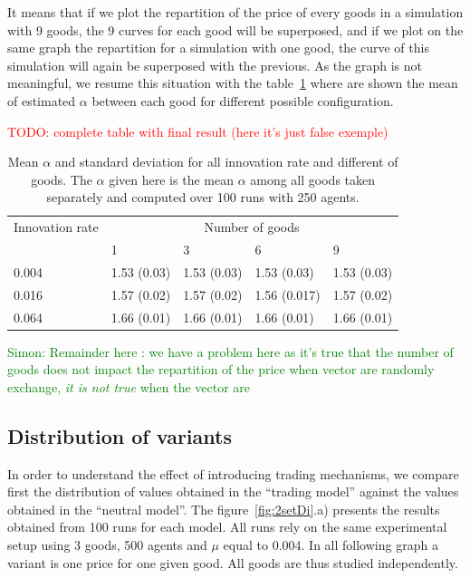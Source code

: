 \documentclass{wscpaperproc}
\newcommand{\memo}[2]{\textcolor{#1}{#2}}
\newcommand{\todo}[1]{\memo{red}{TODO: #1\\}}
\newcommand{\simon}[1]{\memo{green}{Simon: #1\\}}
\begin{document}
It means that if we plot the repartition of the price of every goods in a simulation with 9 goods, the 9 curves for each good will be superposed, and if we plot on the same graph the repartition for a simulation with one good, the curve of this simulation will again be superposed with the previous. As the graph is not meaningful, we resume this situation with the table~\ref{tab:multiGoods} where are shown the mean of estimated $\alpha$ between each good for different possible configuration.


\todo{complete table with final result (here it's just false exemple)}
\begin{table}[h]
	\centering
	\begin{tabular}{l|llll}
		Innovation rate &\multicolumn{4}{c}{Number of goods}\\
		      & 1   & 3   &  6 & 9  \\\hline
		0.004 &1.53 (0.03)  &1.53 (0.03)&1.53 (0.03)&1.53 (0.03) \\
		0.016 &1.57 (0.02)  &1.57 (0.02)&1.56 (0.017)&1.57 (0.02) \\
		0.064 &1.66 (0.01)  &1.66 (0.01)&1.66 (0.01)&1.66 (0.01) \\\hline
	\end{tabular}
	\caption{Mean $\alpha$ and standard deviation for all innovation rate and different  of goods. The $\alpha$ given here is the mean $\alpha$ among all goods taken separately and computed over 100 runs with 250 agents.}
	\label{tab:multiGoods}
\end{table}

\simon{Remainder here : we have a problem here as it's true that the number of goods does not impact the repartition of the price when vector are randomly exchange, \emph{it is not true} when the vector are  }

\subsection{Distribution of variants}

In order to understand the effect of introducing trading mechanisms, we compare first the distribution of values obtained in the ``trading model'' against the values obtained in the ``neutral model''. The figure~\ref{fig:2setDi}.a) presents the results obtained from 100 runs for each model. All runs rely on the same experimental setup using 3 goods, 500 agents and $\mu$ equal to 0.004. In all following graph  a variant is one price for one given good. All goods are thus studied independently. 
\end{document}
